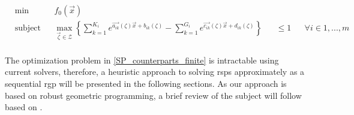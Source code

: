 \begin{equation}
\begin{aligned}
& \min &&f_0\left(\vec{x}\right)\\
& \text{subject to} &&\max_{\vec{\zeta} \in \mathcal{Z}} \left\{\textstyle{\sum}_{k=1}^{K_i}e^{\vec{a_{ik}}\left(\zeta\right)\vec{x} + b_{ik}\left(\zeta\right)} - \textstyle{\sum}_{k=1}^{G_i}e^{\vec{c_{ik}}\left(\zeta\right)\vec{x} + d_{ik}\left(\zeta\right)}\right\} &&\leq 1 &&\forall i \in 1,...,m\\
\end{aligned}
\label{SP_counterparts_finite}
\end{equation}

The optimization problem in \eqref{SP_counterparts_finite} is intractable using current solvers,
therefore,  a heuristic approach to solving \gls{rsp}s approximately
as a sequential \gls{rgp} will be presented in the following sections.
As our approach is based on robust geometric programming,
a brief review of the subject will follow based on \cite{Saab2018}.

